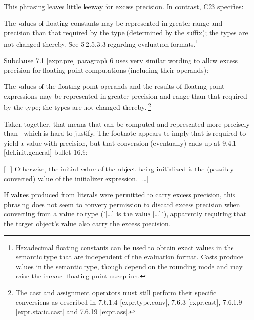 This phrasing leaves little leeway for excess precision.
In contrast, C23 specifies:

\begin{wgText}
  \setcounter{Paras}{5}\pnum
  The values of floating constants may be represented in greater range and
  precision than that required by the type (determined by the suffix); the
  types are not changed thereby. See 5.2.5.3.3 regarding evaluation
  formats.\footnote{Hexadecimal floating constants can be used to obtain exact
    values in the semantic type that are independent of the evaluation format.
    Casts produce values in the semantic type, though depend on the rounding
    mode and may raise the inexact floating-point exception.}
\end{wgText}

Subclause 7.1 [expr.pre] paragraph 6 uses very similar wording to allow excess
precision for floating-point computations (including their operands):

\begin{wgText}
  \setcounter{Paras}{5}\pnum
  The values of the floating-point operands and the results of floating-point
  expressions may be represented in greater precision and range than that
  required by the type; the types are not changed thereby.%
  \footnote{The cast and assignment operators must still perform their specific
    conversions as described in 7.6.1.4 [expr.type.conv], 7.6.3 [expr.cast],
    7.6.1.9 [expr.static.cast] and 7.6.19 [expr.ass].}
\end{wgText}

Taken together, that means that  can be computed and
represented more precisely than , which is hard to justify.
The footnote appears to imply that  is required to yield a
value with \float precision, but that conversion (eventually) ends up at 9.4.1
[dcl.init.general] bullet 16.9:

\begin{wgText}
  \setcounter{Paras}{0}
  [\ldots]
  Otherwise, the initial value of the object being initialized is the (possibly
  converted) value of the initializer expression.
  [\ldots]
\end{wgText}

If values produced from literals were permitted to carry excess precision, this
phrasing does not seem to convery permission to discard excess precision when
converting from a \float value to type \float ("[\ldots] is the value
[\ldots]"), apparently requiring that the target object's value also carry the
excess precision.

